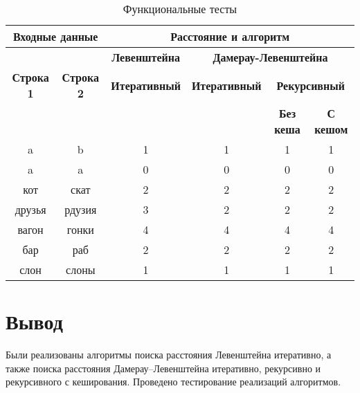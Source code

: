 \begin{table}[ht]
	\small
	\begin{center}
		\begin{threeparttable}
		\caption{Функциональные тесты}
		\label{tbl:func_tests}
		\begin{tabular}{|c|c|c|c|c|c|}
			\hline
			\multicolumn{2}{|c|}{\bfseries Входные данные}
			& \multicolumn{4}{c|}{\bfseries Расстояние и алгоритм} \\ 
			\hline 
			&
			& \multicolumn{1}{c|}{\bfseries Левенштейна} 
			& \multicolumn{3}{c|}{\bfseries Дамерау-Левенштейна} \\ \cline{3-6}
			
			\bfseries Строка 1 & \bfseries Строка 2 & \bfseries Итеративный & \bfseries Итеративный
			
			& \multicolumn{2}{c|}{\bfseries Рекурсивный} \\ \cline{5-6}
			& & & & \bfseries Без кеша & \bfseries С кешом \\
			\hline
			a & b & 1 & 1 & 1 & 1 \\
			\hline
			a & a & 0 & 0 & 0 & 0 \\
			\hline
			кот & скат & 2 & 2 & 2 & 2 \\
			\hline
			друзья & рдузия & 3 & 2 & 2 & 2 \\
			\hline
			вагон & гонки & 4 & 4 & 4 & 4 \\
			\hline
			бар & раб & 2 & 2 & 2 & 2 \\
			\hline
			слон & слоны & 1 & 1 & 1 & 1 \\
			\hline
		\end{tabular}	
		\end{threeparttable}
	\end{center}
\end{table}

\section*{Вывод}

Были реализованы алгоритмы поиска расстояния Левенштейна итеративно, а также поиска расстояния Дамерау–Левенштейна итеративно, рекурсивно и рекурсивного с кеширования. Проведено тестирование реализаций алгоритмов.
